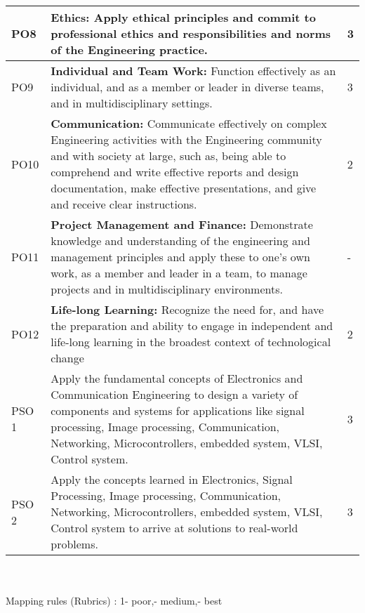 \section*{\centering}
	\begin{tabular}{|p{1cm}|p{12cm}|p{2cm}|}
 
			\hline
			PO8 &\textbf{Ethics:}   Apply ethical principles and commit to professional ethics and 
responsibilities and norms of the Engineering practice.
    & 3 \\ \hline
			PO9 &\textbf{Individual and Team Work: }   Function effectively as an individual, and as
a member or leader in diverse teams, and in multidisciplinary settings.
 &  3\\ \hline
			PO10&\textbf{Communication:}   Communicate effectively on complex Engineering
activities with the Engineering community and with society at large, such
as, being able to comprehend and write effective reports and design
documentation, make effective presentations, and give and receive clear
instructions.& 2\\ \hline
			PO11 &\textbf{Project Management and Finance: }  Demonstrate knowledge and understanding of the engineering and management principles and apply these to one’s own work, as a member and leader in a team, to manage projects and in multidisciplinary environments. &  -\\ \hline
			PO12&\textbf{Life-long Learning:}  Recognize the need for, and have the preparation and ability to engage in independent and life-long learning in the broadest context of technological change& 2\\ \hline
            PSO 1&Apply the fundamental concepts of Electronics and Communication Engineering to design a variety of components and systems for applications like signal processing, Image processing, Communication, Networking, Microcontrollers, embedded system, VLSI, Control system.& 3\\ \hline
            PSO 2&Apply the concepts learned in Electronics, Signal Processing, Image processing, Communication, Networking, Microcontrollers, embedded system, VLSI, Control system to arrive at solutions to real-world problems.& 3\\ \hline
		\end{tabular}
\\
\\ Mapping rules (Rubrics) :
1- poor,- medium,- best
